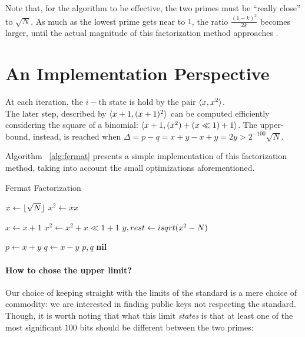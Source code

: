 \begin{remark}
  Note that, for the algorithm to be effective, the two primes must be
  ``really close'' to $\sqrt{N}$. As much as the lowest prime gets near to
  $1$, the ratio $\frac{(1-k)^2}{2k}$ becomes larger, until the actual magnitude
  of this factorization method approaches .
\end{remark}

\section{An Implementation Perspective \label{sec:fermat:implementation}}

At each iteration, the $i-$th state is hold by the pair $\langle x, x^2\rangle$.\\
The later step, described by $\langle x+1, (x+1)^2\rangle$ can be computed efficiently
considering the square of a binomial: $\langle x+1, (x^2) + (x \ll 1) + 1\rangle$.
The upper-bound, instead, is reached when
$ \Delta = p - q  = x + y - x + y = 2y > 2^{-100}\sqrt{N}$.

Algorithm ~\ref{alg:fermat} presents a simple implementation of this
factorization method, taking into account the small optimizations
aforementioned.

\begin{algorithm}[H]
  \caption{Fermat Factorization \label{alg:fermat}}
  \begin{algorithmic}[1]
    \State $x \gets \lfloor\sqrt{N}\rfloor$
    \State $x^2 \gets xx$

    \Repeat
    \State $x \gets x+1$
    \State $x^2 \gets x^2 + x \ll 1 + 1$
    \State $y, rest \gets isqrt(x^2 - N)$

    \State $p \gets x+y$
    \State $q \gets x-y$
    \State \Return $p, q$
    \Else
    \State \Return \textbf{nil}
    \EndIf
    \end{algorithmic}
\end{algorithm}

\paragraph{How to chose the upper limit?}  Our choice of keeping straight with
the limits of the standard is a mere choice of commodity: we are interested in
finding public keys  not respecting the standard.
Though, it is worth noting that what this limit \emph{states} is that at least
one of the most significant $100$ bits should be different between the two
primes:

